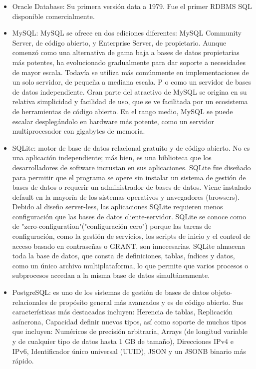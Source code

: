 \documentclass[12pt]{book}
\begin{document}
\begin{itemize}  %
    \item Oracle Database: Su primera versión data a 1979. Fue el primer RDBMS SQL disponible comercialmente.
    \item MySQL: MySQL se ofrece en dos ediciones diferentes: MySQL Community Server, de código abierto, y Enterprise Server, de propietario.  
Aunque comenzó como una alternativa de gama baja a bases de datos propietarias más potentes, ha evolucionado gradualmente para dar soporte a necesidades de mayor escala. Todavía se utiliza más comúnmente en implementaciones de un solo servidor, de pequeña a mediana escala. P o como un servidor de bases de datos independiente. Gran parte del atractivo de MySQL se origina en su relativa simplicidad y facilidad de uso, que se ve facilitada por un ecosistema de herramientas de código abierto.
En el rango medio, MySQL se puede escalar desplegándolo en hardware más potente, como un servidor multiprocesador con gigabytes de memoria. 
    \item SQLite: motor de base de datos relacional gratuito y de código abierto. No es una aplicación independiente; más bien, es una biblioteca que los desarrolladores de software incrustan en sus aplicaciones. SQLite fue diseñado para permitir que el programa se opere sin instalar un sistema de gestión de bases de datos o requerir un administrador de bases de datos. Viene instalado default en la mayoría de los sistemas operativos y navegadores (browsers). 
Debido al diseño server-less, las aplicaciones SQLite requieren menos configuración que las bases de datos cliente-servidor. SQLite se conoce como de "zero-configuration"("configuración cero") porque las tareas de configuración, como la gestión de servicios, los scripts de inicio y el control de acceso basado en contraseñas o GRANT, son innecesarias. 
SQLite almacena toda la base de datos, que consta de definiciones, tablas, índices y datos, como un único archivo multiplataforma, lo que permite que varios procesos o subprocesos accedan a la misma base de datos simultáneamente. 
    \item PostgreSQL: es uno de los sistemas de gestión de bases de datos objeto-relacionales de propósito general más avanzados y es de código abierto. Sus características más destacadas incluyen: Herencia de tablas, Replicación asíncrona, Capacidad definir nuevos tipos, así como soporte de muchos tipos que incluyen: 
Numéricos de precisión arbitraria, Arrays (de longitud variable y de cualquier tipo de datos hasta 1 GB de tamaño), Direcciones IPv4 e IPv6,  Identificador único universal (UUID), JSON y un JSONB binario más rápido.\\

\end{itemize}
\end{document}

